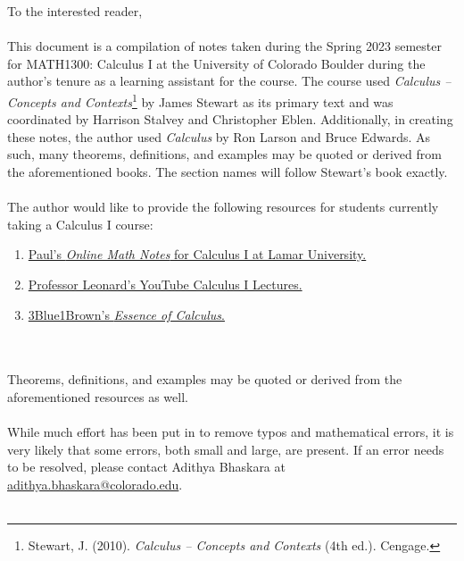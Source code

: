 To the interested reader,
\\
\\
This document is a compilation of notes taken during the Spring 2023 semester for MATH1300: Calculus I at the University of Colorado Boulder during the author's tenure as a learning assistant for the course. The course used \textit{Calculus -- Concepts and Contexts}\footnote{Stewart, J. (2010). \textit{Calculus -- Concepts and Contexts} (4th ed.). Cengage.} by James Stewart as its primary text and was coordinated by Harrison Stalvey and Christopher Eblen. Additionally, in creating these notes, the author used \textit{Calculus} by Ron Larson and Bruce Edwards. As such, many theorems, definitions, and examples may be quoted or derived from the aforementioned books. The section names will follow Stewart's book exactly.
\\
\\
The author would like to provide the following resources for students currently taking a Calculus I course:
\begin{enumerate}
    \item \href{https://tutorial.math.lamar.edu/classes/calci/calci.aspx}{Paul's \textit{Online Math Notes} for Calculus I at Lamar University.}
    \item \href{https://youtube.com/playlist?list=PLF797E961509B4EB5}{Professor Leonard's YouTube Calculus I Lectures.}
    \item \href{https://www.youtube.com/watch?v=WUvTyaaNkzM&list=PLZHQObOWTQDMsr9K-rj53DwVRMYO3t5Yr}{3Blue1Brown's \textit{Essence of Calculus}.}
\end{enumerate}
\vphantom
\\
\\
Theorems, definitions, and examples may be quoted or derived from the aforementioned resources as well.
\\
\\
While much effort has been put in to remove typos and mathematical errors, it is very likely that some errors, both small and large, are present. If an error needs to be resolved, please contact Adithya Bhaskara at \href{mailto:adithya.bhaskara@colorado.edu}{adithya.bhaskara@colorado.edu}.
\\
\\
\vfill
{}